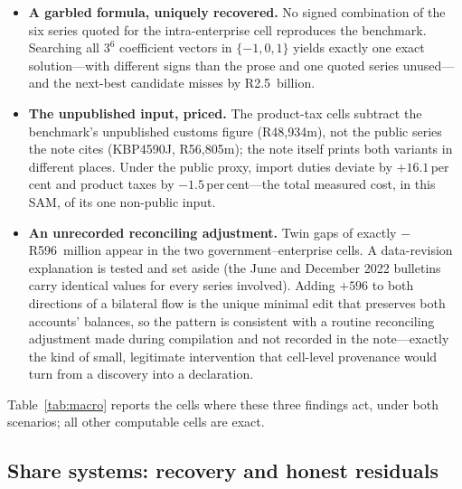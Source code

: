 \begin{itemize}
  \item \textbf{A garbled formula, uniquely recovered.} No signed
  combination of the six series quoted for the intra-enterprise cell
  reproduces the benchmark. Searching all $3^6$ coefficient vectors in
  $\{-1,0,1\}$ yields exactly one exact solution---with different signs than
  the prose and one quoted series unused---and the next-best candidate
  misses by R2.5~billion.
  \item \textbf{The unpublished input, priced.} The product-tax cells
  subtract the benchmark's unpublished customs figure (R48{,}934m), not the
  public series the note cites (KBP4590J, R56{,}805m); the note itself
  prints both variants in different places. Under the public proxy, import
  duties deviate by $+16.1$\,per\,cent and product taxes by
  $-1.5$\,per\,cent---the total measured cost, in this SAM, of its one
  non-public input.
  \item \textbf{An unrecorded reconciling adjustment.} Twin gaps of exactly
  $-$R596~million appear in the two government--enterprise cells. A
  data-revision explanation is tested and set aside (the June and December
  2022 bulletins carry identical values for every series involved). Adding
  $+596$ to both directions of a bilateral flow is the unique minimal edit
  that preserves both accounts' balances, so the pattern is consistent with
  a routine reconciling adjustment made during compilation and not recorded
  in the note---exactly the kind of small, legitimate intervention that
  cell-level provenance would turn from a discovery into a declaration.
\end{itemize}

Table~\ref{tab:macro} reports the cells where these three findings act,
under both scenarios; all other computable cells are exact.

\begin{table}[t]
\centering\small
\caption{Institutional macro cells requiring correction or judgment
(R~million; deviations against the benchmark). ``Proxy'' replaces the
unpublished customs figure with the public series KBP4590J.}
\label{tab:macro}

\end{table}

\subsection{Share systems: recovery and honest residuals}
\label{sec:results:shares}

